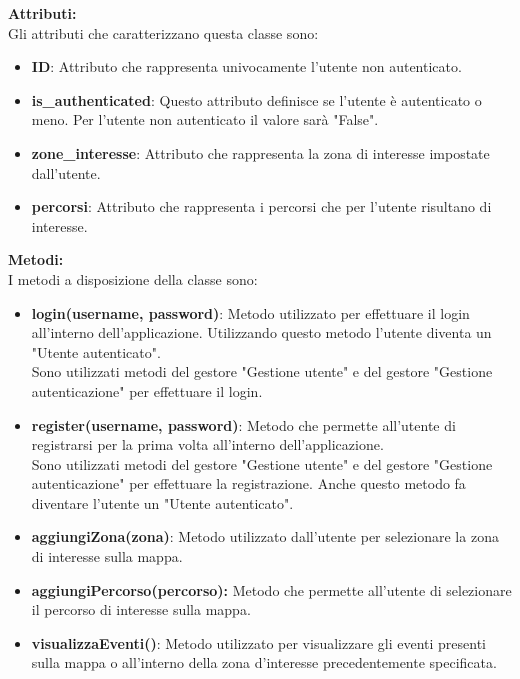 \documentclass{article}
\begin{document}
\textbf{Attributi:}\\

Gli attributi che caratterizzano questa classe sono:
\begin{itemize}
    \item \textbf{ID}: Attributo che rappresenta univocamente l'utente non autenticato.
    \item \textbf{is\_authenticated}: Questo attributo definisce se l'utente è autenticato o meno. Per l'utente non autenticato il valore sarà "False".
    \item \textbf{zone\_interesse}: Attributo che rappresenta la zona di interesse impostate dall'utente.
    \item \textbf{percorsi}: Attributo che rappresenta i percorsi che per l'utente risultano di interesse.
\end{itemize}
 
\clearpage

\textbf{Metodi:}\\

I metodi a disposizione della classe sono:
\begin{itemize}
    \item \textbf{login(username, password)}: Metodo utilizzato per effettuare il login all'interno dell'applicazione. Utilizzando questo metodo l'utente diventa un "Utente autenticato".\\Sono utilizzati metodi del gestore "Gestione utente" e del gestore "Gestione autenticazione" per effettuare il login.
    \item \textbf{register(username, password)}: Metodo che permette all'utente di registrarsi per la prima volta all'interno dell'applicazione.\\Sono utilizzati metodi del gestore "Gestione utente" e del gestore "Gestione autenticazione" per effettuare la registrazione. Anche questo metodo fa diventare l'utente un "Utente autenticato".
    \item \textbf{aggiungiZona(zona)}: Metodo utilizzato dall'utente per selezionare la zona di interesse sulla mappa.\\
    \item \textbf{aggiungiPercorso(percorso):} Metodo che permette all'utente di selezionare il percorso di interesse sulla mappa.
    \item \textbf{visualizzaEventi()}: Metodo utilizzato per visualizzare gli eventi presenti sulla mappa o all'interno della zona d'interesse precedentemente specificata.
\end{itemize} 
\end{document}
